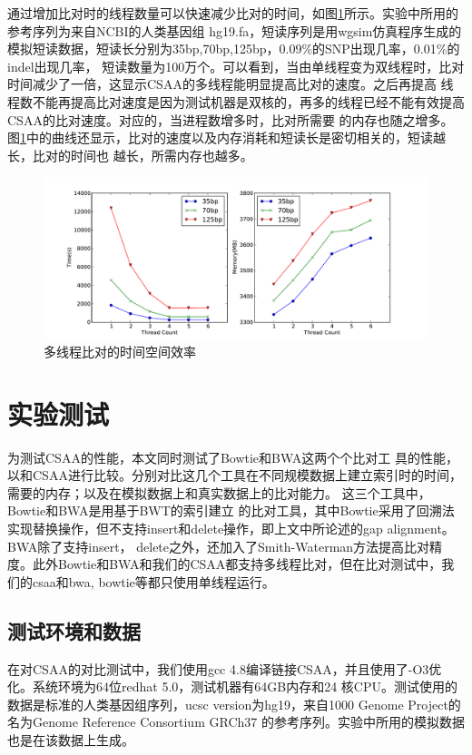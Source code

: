 \documentclass[UTF8,adobefonts]{ctexart}
\begin{document}
通过增加比对时的线程数量可以快速减少比对的时间，如图\ref{fig:alignment}所示。实验中所用的参考序列为来自NCBI的人类基因组
hg19.fa，短读序列是用wgsim仿真程序生成的模拟短读数据，短读长分别为35bp,70bp,125bp，0.09\%的SNP出现几率，0.01\%的indel出现几率，
短读数量为100万个。可以看到，当由单线程变为双线程时，比对时间减少了一倍，这显示CSAA的多线程能明显提高比对的速度。之后再提高
线程数不能再提高比对速度是因为测试机器是双核的，再多的线程已经不能有效提高CSAA的比对速度。对应的，当进程数增多时，比对所需要
的内存也随之增多。图\ref{fig:alignment}中的曲线还显示，比对的速度以及内存消耗和短读长是密切相关的，短读越长，比对的时间也
越长，所需内存也越多。

\begin{figure}[tbp]
    \centering
    \includegraphics[width=1.1\textwidth]{alignment.pdf}
    \caption{多线程比对的时间空间效率} \label{fig:alignment}
\end{figure}

\section{实验测试}

为测试CSAA的性能，本文同时测试了Bowtie\cite{langmead2009ultrafast}和BWA\cite{li2009fast}这两个个比对工
具的性能，以和CSAA进行比较。分别对比这几个工具在不同规模数据上建立索引时的时间，需要的内存；以及在模拟数据上和真实数据上的比对能力。
这三个工具中，Bowtie和BWA是用基于BWT的索引建立
的比对工具，其中Bowtie采用了回溯法实现替换操作，但不支持insert和delete操作，即上文中所论述的gap alignment。BWA除了支持insert，
delete之外，还加入了Smith-Waterman方法提高比对精度。此外Bowtie和BWA和我们的CSAA都支持多线程比对，但在比对测试中，我们的csaa和bwa,
bowtie等都只使用单线程运行。

\subsection{测试环境和数据}

在对CSAA的对比测试中，我们使用gcc 4.8编译链接CSAA，并且使用了-O3优化。系统环境为64位redhat 5.0，测试机器有64GB内存和24
核CPU。测试使用的数据是标准的人类基因组序列，ucsc version为hg19，来自1000 Genome Project的名为Genome Reference Consortium GRCh37
的参考序列。实验中所用的模拟数据也是在该数据上生成。
\end{document}
